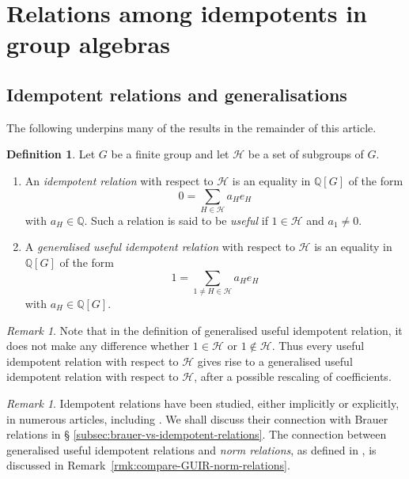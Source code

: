 \documentclass[12pt]{amsart}
\theoremstyle{plain}
\theoremstyle{remark}
\newtheorem{remark}[theorem]{Remark}
\theoremstyle{definition}
\newtheorem{definition}[theorem]{Definition}
\newcommand{\Q}{\mathbb{Q}}
\numberwithin{equation}{section}
\begin{document}
\section{Relations among idempotents in group algebras}

\subsection{Idempotent relations and generalisations}\label{subsec:idempotent-defs}
The following underpins many of the results in the remainder of this article.

\begin{definition}\label{def:idem-relation}
Let $G$ be a finite group and let $\mathcal{H}$ be a set of subgroups of $G$. 
\begin{enumerate}
\item An \emph{idempotent relation} with respect to $\mathcal{H}$ is an equality in $\Q[G]$ of the form
\[
0 = \sum_{H \in \mathcal{H}} a_{H} e_{H}
\]
with $a_{H} \in \Q$. 
Such a relation is said to be \emph{useful} if $1 \in \mathcal{H}$ and $a_{1} \neq 0$.
\item
A \emph{generalised useful idempotent relation} with respect to $\mathcal{H}$
is an equality in $\Q[G]$ of the form
\begin{equation*}\label{eq:special-norm-relation}
1= \sum_{1 \neq H \in \mathcal{H}} a_{H}e_{H}
\end{equation*}
with $a_{H} \in \Q[G]$.
\end{enumerate}
\end{definition}

\begin{remark}
Note that in the definition of generalised useful idempotent relation, it does not make any difference
whether $1 \in \mathcal{H}$ or $1 \notin \mathcal{H}$.
Thus every useful idempotent relation with respect to $\mathcal{H}$
gives rise to a generalised useful idempotent relation with respect to $\mathcal{H}$, 
after a possible rescaling of coefficients.
\end{remark}

\begin{remark}
Idempotent relations have been studied, either implicitly or explicitly, 
in numerous articles, including 
\cite{MR0259105,MR790953,MR873879,MR1000113,MR1269254,MR1473884,MR2032439}.
We shall discuss their connection with Brauer relations in \S 
\ref{subsec:brauer-vs-idempotent-relations}.
The connection between generalised useful idempotent relations and 
\emph{norm relations}, as defined in \cite[Definition~2.1]{MR4440537}, is discussed
in Remark~\ref{rmk:compare-GUIR-norm-relations}. 
\end{remark}
\end{document}
